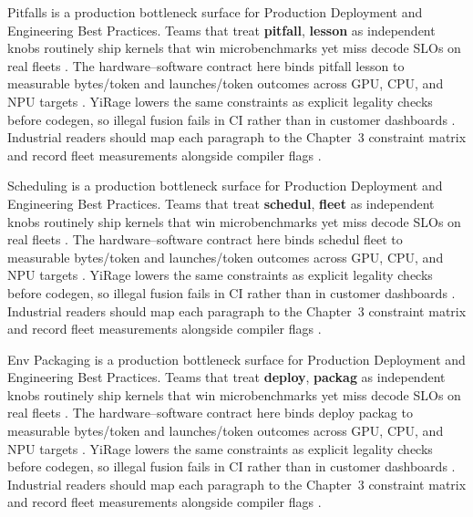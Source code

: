 Pitfalls is a production bottleneck surface for Production Deployment and Engineering Best Practices. Teams that treat \textbf{pitfall}, \textbf{lesson} as independent knobs routinely ship kernels that win microbenchmarks yet miss decode SLOs on real fleets \citep{memoryfloor2026,amd2024xdna}. The hardware--software contract here binds pitfall lesson to measurable bytes/token and launches/token outcomes across GPU, CPU, and NPU targets \citep{nvidia2022hopper,amd2024aie}. YiRage lowers the same constraints as explicit legality checks before codegen, so illegal fusion fails in CI rather than in customer dashboards \citep{semianalysis2024tma,dlbook}. Industrial readers should map each paragraph to the Chapter~3 constraint matrix and record fleet measurements alongside compiler flags \citep{amd2024xdna,dao2022flashattention}.

Scheduling is a production bottleneck surface for Production Deployment and Engineering Best Practices. Teams that treat \textbf{schedul}, \textbf{fleet} as independent knobs routinely ship kernels that win microbenchmarks yet miss decode SLOs on real fleets \citep{nvidia2022hopper,amd2024aie}. The hardware--software contract here binds schedul fleet to measurable bytes/token and launches/token outcomes across GPU, CPU, and NPU targets \citep{semianalysis2024tma,dlbook}. YiRage lowers the same constraints as explicit legality checks before codegen, so illegal fusion fails in CI rather than in customer dashboards \citep{amd2024xdna,dao2022flashattention}. Industrial readers should map each paragraph to the Chapter~3 constraint matrix and record fleet measurements alongside compiler flags \citep{amd2024aie,kwon2023vllm}.

Env Packaging is a production bottleneck surface for Production Deployment and Engineering Best Practices. Teams that treat \textbf{deploy}, \textbf{packag} as independent knobs routinely ship kernels that win microbenchmarks yet miss decode SLOs on real fleets \citep{semianalysis2024tma,dlbook}. The hardware--software contract here binds deploy packag to measurable bytes/token and launches/token outcomes across GPU, CPU, and NPU targets \citep{amd2024xdna,dao2022flashattention}. YiRage lowers the same constraints as explicit legality checks before codegen, so illegal fusion fails in CI rather than in customer dashboards \citep{amd2024aie,kwon2023vllm}. Industrial readers should map each paragraph to the Chapter~3 constraint matrix and record fleet measurements alongside compiler flags \citep{dlbook,nvidia2024cudagraphs}.


